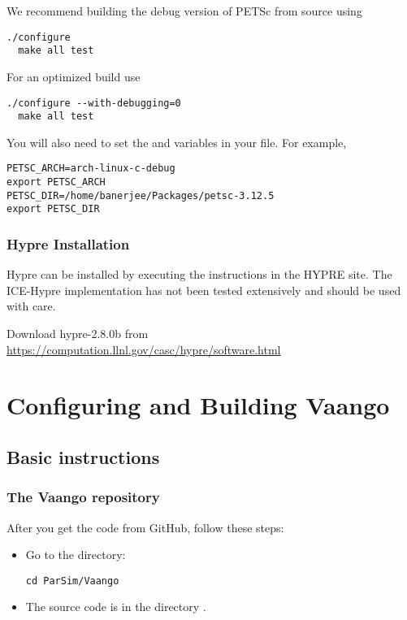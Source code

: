\documentclass[11pt,fleqn]{book} %
\begin{document}
We recommend building the debug version of PETSc from source using
\begin{lstlisting}[backgroundcolor=\color{background}]
  ./configure
  make all test
\end{lstlisting}

For an optimized build use
\begin{lstlisting}[backgroundcolor=\color{background}]
  ./configure --with-debugging=0
  make all test
\end{lstlisting}

You will also need to set the  and  variables in your
 file.  For example,
\begin{lstlisting}[backgroundcolor=\color{background}]
PETSC_ARCH=arch-linux-c-debug
export PETSC_ARCH 
PETSC_DIR=/home/banerjee/Packages/petsc-3.12.5
export PETSC_DIR
\end{lstlisting}

\subsection{Hypre Installation}
Hypre can be installed by executing the instructions in the HYPRE site.  The ICE-Hypre 
implementation has not been tested extensively and should be used with care.

Download hypre-2.8.0b from
\url{https://computation.llnl.gov/casc/hypre/software.html}

\chapter{Configuring and Building Vaango}
\section{Basic instructions}
\subsection{ The Vaango repository}
After you get the code from GitHub, follow these steps:
\begin{itemize}
  \item Go to the  directory:

\begin{lstlisting}[backgroundcolor=\color{background}]
     cd ParSim/Vaango
\end{lstlisting}

  \item  The source code is in the directory .
\end{itemize}
\end{document}
